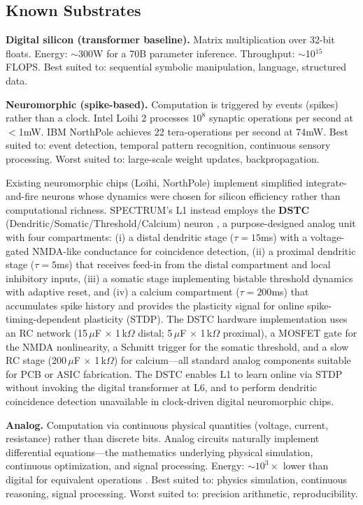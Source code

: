 \documentclass[12pt]{article}
\begin{document}
\subsection{Known Substrates}

\textbf{Digital silicon (transformer baseline).} Matrix multiplication over 32-bit floats. Energy: $\sim$300W for a 70B parameter inference. Throughput: $\sim$10$^{15}$ FLOPS. Best suited to: sequential symbolic manipulation, language, structured data.

\textbf{Neuromorphic (spike-based).} Computation is triggered by events (spikes) rather than a clock. Intel Loihi 2 \cite{davies2021} processes $10^8$ synaptic operations per second at $<$1mW. IBM NorthPole \cite{ibm2023} achieves 22 tera-operations per second at 74mW. Best suited to: event detection, temporal pattern recognition, continuous sensory processing. Worst suited to: large-scale weight updates, backpropagation.

Existing neuromorphic chips (Loihi, NorthPole) implement simplified integrate-and-fire neurons whose dynamics were chosen for silicon efficiency rather than computational richness. SPECTRUM's L1 instead employs the \textbf{DSTC} (Dendritic/Somatic/Threshold/Calcium) neuron \cite{lin2026dstc}, a purpose-designed analog unit with four compartments: (i) a distal dendritic stage ($\tau=15$ms) with a voltage-gated NMDA-like conductance for coincidence detection, (ii) a proximal dendritic stage ($\tau=5$ms) that receives feed-in from the distal compartment and local inhibitory inputs, (iii) a somatic stage implementing bistable threshold dynamics with adaptive reset, and (iv) a calcium compartment ($\tau=200$ms) that accumulates spike history and provides the plasticity signal for online spike-timing-dependent plasticity (STDP). The DSTC hardware implementation uses an RC network (15\,$\mu$F $\times$ 1\,k$\Omega$ distal; 5\,$\mu$F $\times$ 1\,k$\Omega$ proximal), a MOSFET gate for the NMDA nonlinearity, a Schmitt trigger for the somatic threshold, and a slow RC stage (200\,$\mu$F $\times$ 1\,k$\Omega$) for calcium---all standard analog components suitable for PCB or ASIC fabrication. The DSTC enables L1 to learn online via STDP without invoking the digital transformer at L6, and to perform dendritic coincidence detection unavailable in clock-driven digital neuromorphic chips.

\textbf{Analog.} Computation via continuous physical quantities (voltage, current, resistance) rather than discrete bits. Analog circuits naturally implement differential equations---the mathematics underlying physical simulation, continuous optimization, and signal processing. Energy: $\sim$$10^3\times$ lower than digital for equivalent operations \cite{sarpeshkar2010}. Best suited to: physics simulation, continuous reasoning, signal processing. Worst suited to: precision arithmetic, reproducibility.
\end{document}
